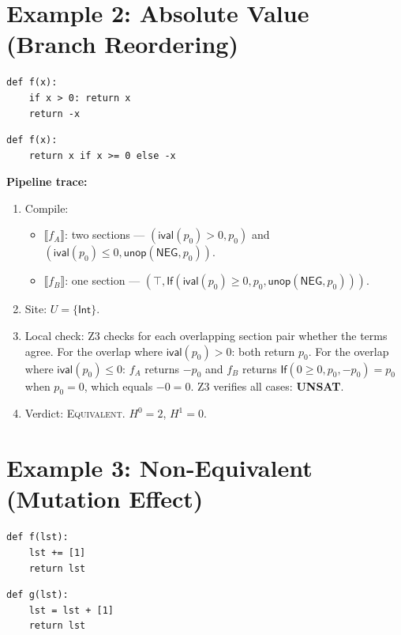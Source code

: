 \documentclass[11pt,a4paper]{report}
\theoremstyle{definition}
\theoremstyle{plain}
\newcommand{\den}[1]{\llbracket #1 \rrbracket}     %
\newcommand{\Hzero}{H^0}
\newcommand{\Hone}{H^1}
\begin{document}
\section{Example 2: Absolute Value (Branch Reordering)}

\begin{lstlisting}[caption={Branch order A}]
def f(x):
    if x > 0: return x
    return -x
\end{lstlisting}

\begin{lstlisting}[caption={Branch order B}]
def f(x):
    return x if x >= 0 else -x
\end{lstlisting}

\textbf{Pipeline trace:}
\begin{enumerate}
  \item Compile:
    \begin{itemize}
      \item $\den{f_A}$: two sections ---
        $(\mathsf{ival}(p_0) > 0, p_0)$ and
        $(\mathsf{ival}(p_0) \leq 0, \mathsf{unop}(\mathsf{NEG}, p_0))$.
      \item $\den{f_B}$: one section ---
        $(\top, \mathsf{If}(\mathsf{ival}(p_0) \geq 0, p_0,
        \mathsf{unop}(\mathsf{NEG}, p_0)))$.
    \end{itemize}
  \item Site: $U = \{\mathsf{Int}\}$.
  \item Local check: Z3 checks for each overlapping section pair
    whether the terms agree.  For the overlap where
    $\mathsf{ival}(p_0) > 0$: both return $p_0$.  For the overlap
    where $\mathsf{ival}(p_0) \leq 0$: $f_A$ returns $-p_0$ and
    $f_B$ returns $\mathsf{If}(0 \geq 0, p_0, -p_0) = p_0$ when
    $p_0 = 0$, which equals $-0 = 0$.  Z3 verifies all cases:
    \textbf{UNSAT}.
  \item Verdict: \textsc{Equivalent}.  $\Hzero = 2$, $\Hone = 0$.
\end{enumerate}

\section{Example 3: Non-Equivalent (Mutation Effect)}

\begin{lstlisting}[caption={In-place +=}]
def f(lst):
    lst += [1]
    return lst
\end{lstlisting}

\begin{lstlisting}[caption={Reassignment +}]
def g(lst):
    lst = lst + [1]
    return lst
\end{lstlisting}
\end{document}
